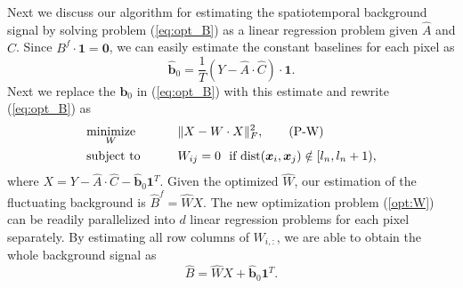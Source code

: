 \documentclass[9pt,lineno]{elife}
\begin{document}
Next we discuss our algorithm for estimating the spatiotemporal background signal by solving problem (\ref{eq:opt_B}) as a linear regression problem given $\hat{A}$ and $\hat{C}$. Since  $B^f\cdot \bm{1}=\bm{0}$, we can easily estimate the constant baselines for each pixel as 
\begin{equation}
   \hat{\bm{b}}_0 = \frac{1}{T}(Y-\hat{A}\cdot\hat{C})\cdot \bm{1}.
\end{equation}
Next we replace the $\bm{b}_0$ in (\ref{eq:opt_B}) with this estimate and rewrite (\ref{eq:opt_B}) as 
\begin{alignat}{2}
&\underset{W}{\text{minimize}} &\qquad& \|{X}- W\cdot {X}\|_F^2, \label{opt:W}\tag{P-W}\\
&\text{subject to}  && W_{ij}=0 ~ \text{ if } \text{dist}(\bm{x}_i, \bm{x}_j) \notin [l_n, l_n+1) \notag,  
\end{alignat}
where ${X}=Y-\hat{A}\cdot \hat{C}-\hat{\bm{b}}_0 \bm{1}^T$. Given the optimized $\hat{W}$, our estimation of the fluctuating background is $\hat{B}^f = \hat{W}{X}$. The new optimization problem (\ref{opt:W}) can be readily parallelized into $d$ linear regression problems  for each pixel separately. By estimating all row columns of $W_{i,:}$, we are able to obtain the whole background signal as 
\begin{equation}
  \hat{B} = \hat{W}X + \hat{\bm{b}}_0\bm{1}^T. 
\end{equation}
\end{document}
